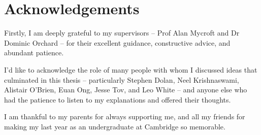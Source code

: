 \chapter*{Acknowledgements}

\begingroup
\onehalfspacing

Firstly, I am deeply grateful to my supervisors -- Prof Alan Mycroft and Dr Dominic Orchard -- for their excellent guidance, constructive advice, and abundant patience.

I'd like to acknowledge the role of many people with whom I discussed ideas that culminated in this thesis -- particularly Stephen Dolan, Neel Krishnaswami, Alistair O'Brien, Euan Ong, Jesse Tov, and Leo White -- and anyone else who had the patience to listen to my explanations and offered their thoughts.

I am thankful to my parents for always supporting me, and all my friends for making my last year as an undergraduate at Cambridge so memorable.

\endgroup